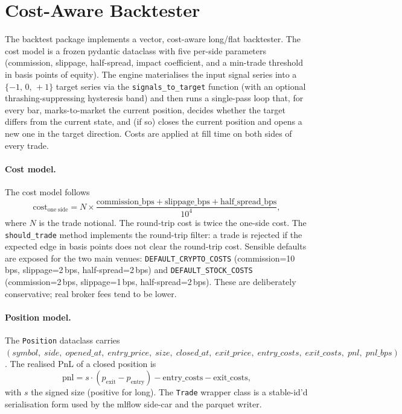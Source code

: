\documentclass[11pt,a4paper]{article}
\let\oldsection\section
\renewcommand{\section}{\clearpage\oldsection}
\begin{document}
\section{Cost-Aware Backtester}\label{sec:bt}

The backtest package implements a vector, cost-aware
long/flat backtester. The cost model is a frozen pydantic
dataclass with five per-side parameters (commission,
slippage, half-spread, impact coefficient, and a min-trade
threshold in basis points of equity). The engine
materialises the input signal series into a
$\{-1,\,0,\,+1\}$ target series via the
\texttt{signals\_to\_target} function (with an optional
thrashing-suppressing hysteresis band) and then runs a
single-pass loop that, for every bar, marks-to-market the
current position, decides whether the target differs from
the current state, and (if so) closes the current position
and opens a new one in the target direction. Costs are
applied at fill time on both sides of every trade.

\paragraph{Cost model.}
The cost model follows
\[
\mathrm{cost}_{\mathrm{one\;side}} = N\times
\frac{\mathrm{commission\_bps}+\mathrm{slippage\_bps}+\mathrm{half\_spread\_bps}}{10^{4}},
\]
where $N$ is the trade notional. The round-trip cost is
twice the one-side cost. The \texttt{should\_trade} method
implements the round-trip filter: a trade is rejected if the
expected edge in basis points does not clear the round-trip
cost. Sensible defaults are exposed for the two main
venues: \texttt{DEFAULT\_CRYPTO\_COSTS} (commission=10\,bps,
slippage=2\,bps, half-spread=2\,bps) and
\texttt{DEFAULT\_STOCK\_COSTS} (commission=2\,bps,
slippage=1\,bps, half-spread=2\,bps). These are
deliberately conservative; real broker fees tend to be
lower.

\paragraph{Position model.}
The \texttt{Position} dataclass carries
\((symbol,\;side,\;opened\_at,\;entry\_price,\;size,\;closed\_at,\;exit\_price,\;entry\_costs,\;exit\_costs,\;pnl,\;pnl\_bps)\).
The realised PnL of a closed position is
\[
\mathrm{pnl} = s\cdot (p_{\mathrm{exit}}-p_{\mathrm{entry}}) -
\mathrm{entry\_costs} - \mathrm{exit\_costs},
\]
with $s$ the signed size (positive for long). The
\texttt{Trade} wrapper class is a stable-id'd serialisation
form used by the mlflow side-car and the parquet writer.
\end{document}

